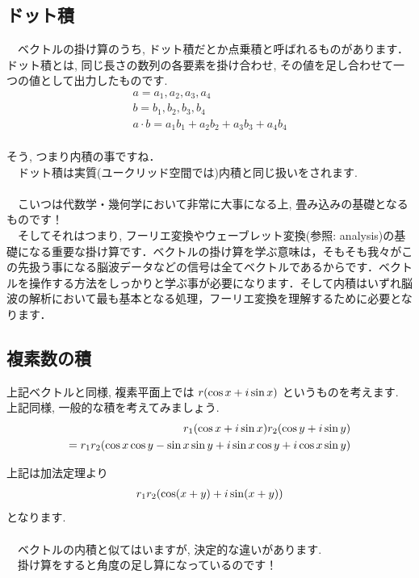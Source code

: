 \documentclass[11pt,a4paper,uplatex]{ujreport}
\begin{document}
\subsection{ドット積}
　ベクトルの掛け算のうち, ドット積だとか点乗積と呼ばれるものがあります．ドット積とは, 同じ長さの数列の各要素を掛け合わせ, その値を足し合わせて一つの値として出力したものです.\\
\begin{align}
a = {a_1,a_2,a_3,a_4}\\
b={b_1,b_2,b_3,b_4}\\
a\cdot b = a_1b_1 + a_2b_2 + a_3b_3 + a_4b_4
\end{align}
\\
そう, つまり内積の事ですね．\\
　ドット積は実質(ユークリッド空間では)内積と同じ扱いをされます.\\
\\
　こいつは代数学・幾何学において非常に大事になる上, 畳み込みの基礎となるものです！\\
　そしてそれはつまり, フーリエ変換やウェーブレット変換(参照: analysis)の基礎になる重要な掛け算です．ベクトルの掛け算を学ぶ意味は，そもそも我々がこの先扱う事になる脳波データなどの信号は全てベクトルであるからです．ベクトルを操作する方法をしっかりと学ぶ事が必要になります．そして内積はいずれ脳波の解析において最も基本となる処理，フーリエ変換を理解するために必要となります．\\

\subsection{複素数の積}
上記ベクトルと同様, 複素平面上では $\mathstrut r (\cos x + \mathstrut i\sin x)$ というものを考えます.\\
上記同様, 一般的な積を考えてみましょう.\\

\begin{align}
\mathstrut r_1(\cos x + \mathstrut i\sin x)\mathstrut r_2(\cos y + \mathstrut i\sin y)\\
= \mathstrut r_1\mathstrut r_2(\cos x\cos y - \sin x\sin y + \mathstrut i\sin x \cos y + \mathstrut i\cos x\sin y)
\end{align}

上記は加法定理より
\begin{eqnarray}
\mathstrut r_1\mathstrut r_2(\cos (\mathstrut x + \mathstrut y) + \mathstrut i\sin (\mathstrut x + \mathstrut y))
\end{eqnarray}
となります.\\
\\
　ベクトルの内積と似てはいますが, 決定的な違いがあります.\\
　掛け算をすると角度の足し算になっているのです！\\
\end{document}
